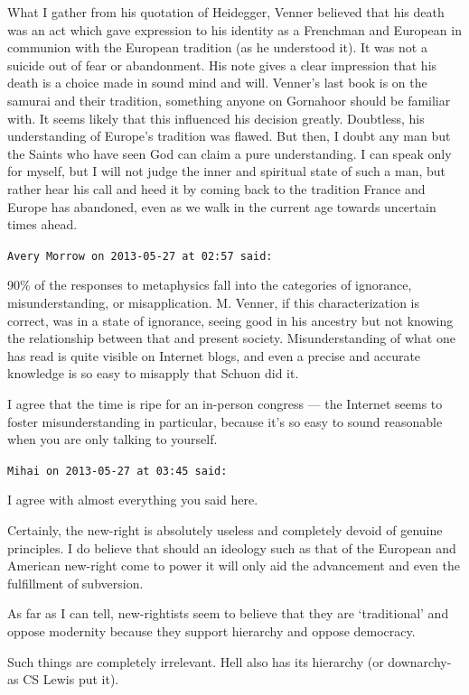\begin{footnotesize}
\begin{sffamily}
What I gather from his quotation of Heidegger, Venner believed that his death was an act which gave expression to his identity as a Frenchman and European in communion with the European tradition (as he understood it). It was not a suicide out of fear or abandonment. His note gives a clear impression that his death is a choice made in sound mind and will. Venner's last book is on the samurai and their tradition, something anyone on Gornahoor should be familiar with. It seems likely that this influenced his decision greatly. Doubtless, his understanding of Europe's tradition was flawed. But then, I doubt any man but the Saints who have seen God can claim a pure understanding. I can speak only for myself, but I will not judge the inner and spiritual state of such a man, but rather hear his call and heed it by coming back to the tradition France and Europe has abandoned, even as we walk in the current age towards uncertain times ahead.

\hfill

\texttt{Avery Morrow on 2013-05-27 at 02:57 said:}

90\% of the responses to metaphysics fall into the categories of ignorance, misunderstanding, or misapplication. M. Venner, if this characterization is correct, was in a state of ignorance, seeing good in his ancestry but not knowing the relationship between that and present society. Misunderstanding of what one has read is quite visible on Internet blogs, and even a precise and accurate knowledge is so easy to misapply that Schuon did it.

I agree that the time is ripe for an in-person congress --- the Internet seems to foster misunderstanding in particular, because it's so easy to sound reasonable when you are only talking to yourself.

\hfill

\texttt{Mihai on 2013-05-27 at 03:45 said:}

I agree with almost everything you said here.

Certainly, the new-right is absolutely useless and completely devoid of genuine principles. I do believe that should an ideology such as that of the European and American new-right come to power it will only aid the advancement and even the fulfillment of subversion.

As far as I can tell, new-rightists seem to believe that they are `traditional' and oppose modernity because they support hierarchy and oppose democracy.

Such things are completely irrelevant. Hell also has its hierarchy (or downarchy- as CS Lewis put it).


\end{sffamily}
\end{footnotesize}
